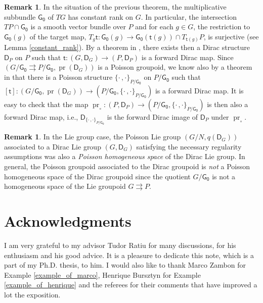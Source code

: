 \documentclass{amsart}
\theoremstyle{definition}
\newtheorem{remark}[theorem]{Remark}
\begin{document}
\begin{remark}
In the situation of the previous theorem,
the multiplicative 
subbundle $\mathsf{G_0}$  of $TG$ has constant rank on $G$. In particular, 
the intersection $TP\cap\mathsf{G_0}$ is a smooth vector bundle over $P$
and for each $g\in G$, the restriction 
to $\mathsf{G_0}(g)$
of the target map, $T_g{{\mathsf{t}}}:\mathsf{G_0}(g)\to \mathsf{G_0}({{\mathsf{t}}}(g))\cap T_{{{\mathsf{t}}}(g)}P$,
is surjective (see Lemma \ref{constant_rank}). 
By a  theorem in \cite{Jotz11c}, there exists
then a Dirac structure $\mathsf D_P$ on $P$ such that 
${{\mathsf{t}}}: (G, \mathsf D_G)\to (P,\mathsf D_P)$
is a forward Dirac map.
Since $(G/\mathsf{G_0}{{\rightrightarrows}} P/\mathsf{G_0}, \operatorname{pr}(\mathsf D_G))$
is a Poisson groupoid,  we know also
by a theorem in \cite{Weinstein88b} that there is   
a Poisson structure $\{\cdot\,,\cdot\}_{P/\mathsf{G_0}}$ on $P/\mathsf{G_0}$ such that
$[{{\mathsf{t}}}]:(G/\mathsf{G_0}, \operatorname{pr}(\mathsf D_G))\to (P/\mathsf{G_0},\{\cdot\,,\cdot\}_{P/\mathsf{G_0}})$
is a forward Dirac map.
It is easy to check that
the map $\operatorname{pr}_\circ:(P,\mathsf D_P)\to (P/\mathsf{G_0},\{\cdot\,,\cdot\}_{P/\mathsf{G_0}})$
is then also a forward Dirac map, i.e.,
$\mathsf D_{\{\cdot\,,\cdot\}_{P/\mathsf{G_0}}}$ is the forward Dirac image 
of $\mathsf D_P$ under $\operatorname{pr}_\circ$.  
\end{remark}

\begin{remark}
In the Lie group case, the Poisson Lie group $(G/N, q(\mathsf{D}_G))$ associated to a
 Dirac Lie group
$(G, \mathsf D_G)$ satisfying the necessary regularity assumptions 
was also a \emph{Poisson homogeneous space}
of the Dirac Lie group. In general, the Poisson groupoid 
associated to the Dirac  groupoid is \emph{not} a Poisson homogeneous space of the Dirac groupoid
since the quotient $G/\mathsf{G_0}$ is not a homogeneous space of the Lie groupoid $G{{\rightrightarrows}} P$.
\end{remark}

\section*{Acknowledgments}
 I am very grateful to my advisor Tudor Ratiu for many discussions, for
his enthusiasm and his good advice.
It is a pleasure to dedicate this note, which is a part of my Ph.D. thesis, to him.
I would also like to thank Marco Zambon for Example 
\ref{example_of_marco}, Henrique Bursztyn for Example \ref{example_of_henrique}
and the referees for their comments that have improved a lot the exposition.
\end{document}
